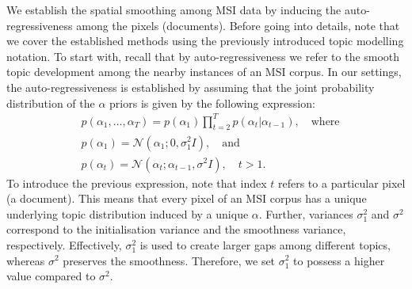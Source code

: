 \documentclass{mpaper}
\begin{document}
\par We establish the spatial smoothing among MSI data by inducing the auto-regressiveness among the pixels (documents). Before going into details, note that we cover the established methods using the previously introduced topic modelling notation. To start with, recall that by auto-regressiveness we refer to the smooth topic development among the nearby instances of an MSI corpus. In our settings, the auto-regressiveness is established by assuming that the joint probability distribution of the $\alpha$ priors is given by the following expression:
\begin{align*}
&p(\alpha_1,\ldots,\alpha_T) =p(\alpha_1)\prod_{t=2}^{T}{p(\alpha_t|\alpha_{t-1})}, \quad \mbox{where}\\
&p(\alpha_1) =\mathcal{N} (\alpha_1; 0, \sigma_1^2I), \quad \mbox{and}\\
&p(\alpha_t) =\mathcal{N} (\alpha_t; \alpha_{t-1}, \sigma^2I), \quad t>1.
\end{align*}
To introduce the previous expression, note that index $t$ refers to a particular pixel (a document). This means that every pixel of an MSI corpus has a unique underlying topic distribution induced by a unique $\alpha$. Further, variances $\sigma_1^2$ and $\sigma^2$ correspond to the initialisation variance and the smoothness variance, respectively. Effectively, $\sigma_1^2$ is used to create larger gaps among different topics, whereas $\sigma^2$ preserves the smoothness. Therefore, we set $\sigma_1^2$ to possess a higher value compared to $\sigma^2$.
\end{document}
